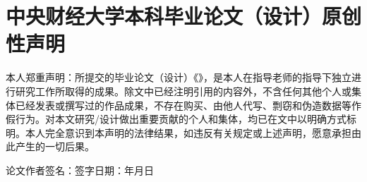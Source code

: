 \chapter{中央财经大学本科毕业论文（设计）原创性声明}

本人郑重声明：所提交的毕业论文（设计）《\MYTITLE》，是本人在指导老师的指导下独立进行研究工作所取得的成果。除文中已经注明引用的内容外，不含任何其他个人或集体已经发表或撰写过的作品成果，不存在购买、由他人代写、剽窃和伪造数据等作假行为。对本文研究/设计做出重要贡献的个人和集体，均已在文中以明确方式标明。本人完全意识到本声明的法律结果，如违反有关规定或上述声明，愿意承担由此产生的一切后果。

\vspace{44bp}
\noindent 论文作者签名：\hspace*{18em}签字日期：\hspace*{2em}年\hspace*{1em}月\hspace*{1em}日

